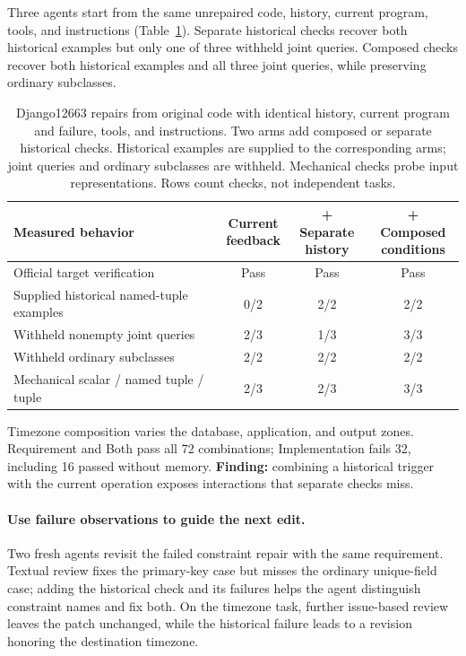 Three agents start from the same unrepaired code, history, current program,
tools, and instructions (Table~\ref{tab:composedconditions}). Separate
historical checks recover both historical examples but only one of three
withheld joint queries. Composed checks recover both historical examples
and all three joint queries, while preserving ordinary subclasses.

\begin{table}[!htbp]
\centering
\caption{Django12663 repairs from original code with identical history,
current program and failure, tools, and instructions. Two arms add composed
or separate historical checks. Historical examples are supplied to the corresponding arms; joint queries and ordinary subclasses are withheld. Mechanical checks probe input representations. Rows count checks, not independent tasks.}
\label{tab:composedconditions}
\begin{tabular*}{\linewidth}{@{}l@{\extracolsep{\fill}}ccc@{}}
\toprule
Measured behavior & \shortstack{Current\\feedback} & \shortstack{+ Separate\\history} & \shortstack{+ Composed\\conditions}  \\
\midrule
Official target verification & Pass & Pass & Pass \\
Supplied historical named-tuple examples & 0/2 & 2/2 & 2/2 \\
Withheld nonempty joint queries & 2/3 & 1/3 & 3/3 \\
Withheld ordinary subclasses & 2/2 & 2/2 & 2/2 \\
Mechanical scalar / named tuple / tuple & 2/3 & 2/3 & 3/3 \\
\bottomrule
\end{tabular*}
\end{table}

Timezone composition varies the database, application, and output zones.
Requirement and Both pass all 72 combinations; Implementation fails 32,
including 16 passed without memory.
\textbf{Finding:} combining a historical trigger with the current operation
exposes interactions that separate checks miss.

\paragraph{Use failure observations to guide the next edit.}
\label{sec:feedback-results}
Two fresh agents revisit the failed constraint repair with the same
requirement. Textual review fixes the primary-key case but misses the ordinary
unique-field case; adding the historical check and its failures helps the
agent distinguish constraint names and fix both. On the timezone task,
further issue-based review leaves the patch unchanged, while the historical
failure leads to a revision honoring the destination timezone.

